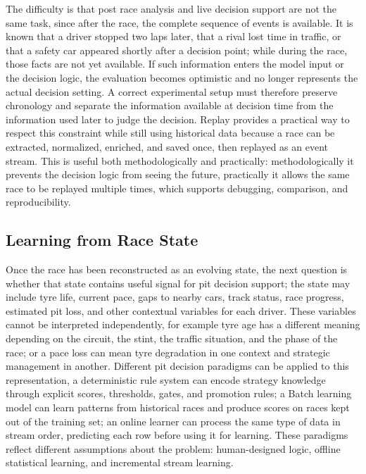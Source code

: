 The difficulty is that post race analysis and live decision support are not the same task, since after the race, the complete sequence of events is available. It is known that a
driver stopped two laps later, that a rival lost time in traffic, or that a safety car appeared shortly after a decision point; while during the race, those facts are not yet
available. If such information enters the model input or the decision logic, the evaluation becomes optimistic and no longer represents the actual decision setting. A
correct experimental setup must therefore preserve chronology and separate the information available at decision time from the information used later to judge the decision.
Replay provides a practical way to respect this constraint while still using historical data because a race can be extracted, normalized, enriched, and saved once, then replayed
as an event stream.
This is useful both methodologically and practically: methodologically it prevents the decision logic from seeing the future, practically it allows the same race to be
replayed multiple times, which supports debugging, comparison, and reproducibility.

\subsection{Learning from Race State}

Once the race has been reconstructed as an evolving state, the next question is whether that state contains useful signal for pit decision support; the state 
may include tyre life, current pace, gaps to nearby cars, track status, race progress, estimated pit loss, and other contextual variables for each driver. These variables cannot
be interpreted independently, for example tyre age has a different meaning depending on the circuit, the stint, the traffic situation, and the phase of the race; or a pace loss can mean
tyre degradation in one context and strategic management in another.
Different pit decision paradigms can be applied to this representation, a deterministic rule system can encode strategy knowledge through explicit scores, thresholds, gates, and
promotion rules; a Batch learning model can learn patterns from historical races and produce scores on races kept out of the training set; an online learner can process the
same type of data in stream order, predicting each row before using it for learning. These paradigms reflect different assumptions about the problem: human-designed logic,
offline statistical learning, and incremental stream learning.

